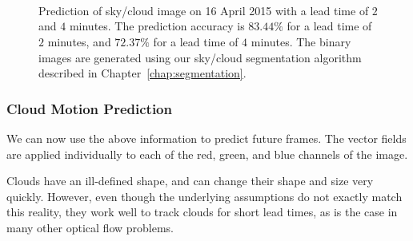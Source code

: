 \begin{figure}[htb]
\begin{center}
\,
\\
\vspace{-4mm}
\,
\,
\,
\\
\vspace{-4mm}
\,
\,
\,
\caption[Prediction of sky/cloud image for a sample day with a lead time of $2$ and $4$ minutes. ]{Prediction of sky/cloud image on 16 April 2015 with a lead time of $2$ and $4$ minutes. The prediction accuracy is $83.44\%$ for a lead time of $2$ minutes, and $72.37\%$ for a lead time of $4$ minutes. The binary images are generated using our sky/cloud segmentation algorithm described in Chapter~\ref{chap:segmentation}.
\label{fig:example1}}
\end{center}
\end{figure}


\subsubsection{Cloud Motion Prediction}

We can now use the above information to predict future frames. The vector fields are applied individually to each of the red, green, and blue channels of the image.

Clouds have an ill-defined shape, and can change their shape and size very quickly. However, even though the underlying assumptions do not exactly match this reality, they work well to track clouds for short lead times, as is the case in many other optical flow problems.

